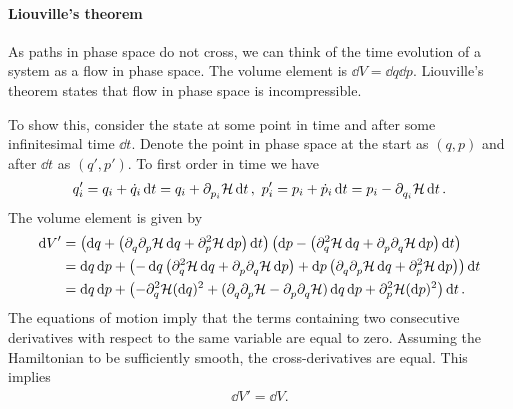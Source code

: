 
\paragraph{Liouville's theorem}
As paths in phase space do not cross, we can think of the time evolution of a system as a flow in phase space. The volume element is $\dd{V} = \dd{q}\dd{p}$. Liouville's theorem states that flow in phase space is incompressible.

To show this, consider the state at some point in time and after some infinitesimal time $\dd{t}$. Denote the point in phase space at the start as $(q, p)$ and after $\dd{t}$ as $(q', p').$ To first order in time we have
\begin{align*}
	q_{i}' = q_{i} + \dot{q}_{i}\dd{t} = q_{i} + \del{p_{i}}{\ham}\dd{t},\ p_{i}' = p_{i} + \dot{p}_{i}\dd{t} = p_{i} - \del{q_{i}}{\ham}\dd{t}.
\end{align*}
The volume element is given by
\begin{align*}
	\dd{V}' &= \left(\dd{q} +  \left(\del{q}{\del{p}{\ham}}\dd{q} + \del[2]{p}{\ham}\dd{p}\right)\dd{t}\right)\left(\dd{p} -  \left(\del[2]{q}{\ham}\dd{q} + \del{p}{\del{q}{\ham}}\dd{p}\right)\dd{t}\right) \\
	        &= \dd{q}\dd{p} + \left(-\dd{q}\left(\del[2]{q}{\ham}\dd{q} + \del{p}{\del{q}{\ham}}\dd{p}\right) + \dd{p\left(\del{q}{\del{p}{\ham}}\dd{q} + \del[2]{p}{\ham}\dd{p}\right)}\right)\dd{t} \\
	        &= \dd{q}\dd{p} + \left(-\del[2]{q}{\ham}(\dd{q})^{2} + (\del{q}{\del{p}{\ham}} - \del{p}{\del{q}{\ham}})\dd{q}\dd{p} + \del[2]{p}{\ham}(\dd{p})^{2}\right)\dd{t}.
\end{align*}
The equations of motion imply that the terms containing two consecutive derivatives with respect to the same variable are equal to zero. Assuming the Hamiltonian to be sufficiently smooth, the cross-derivatives are equal. This implies
\begin{align*}
	\dd{V}' = \dd{V}.
\end{align*}

